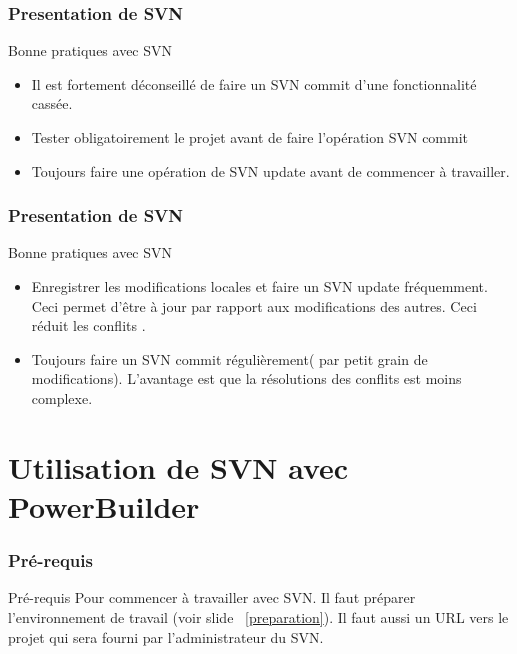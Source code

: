 \documentclass{beamer}
\begin{document}
\begin{frame}
\frametitle{Presentation de SVN}
\begin{block}{Bonne pratiques avec SVN}
\begin{itemize}
\item  Il est fortement déconseillé de faire un \alert{SVN commit  d’une fonctionnalité cassée}.
\item \alert{Tester obligatoirement le projet} avant de faire l’opération SVN commit
\item Toujours faire une opération de  \alert{SVN update} avant de commencer à travailler. 
 
\end{itemize}
\end{block}
\end{frame}

\begin{frame}
\frametitle{Presentation de SVN}
\begin{block}{Bonne pratiques avec SVN}
\begin{itemize}
\item Enregistrer  les modifications locales et faire un \alert{SVN update} fréquemment. Ceci permet d'être à jour par rapport aux modifications des autres. Ceci réduit les conflits .
\item Toujours faire  un \alert{SVN commit} régulièrement( par petit grain de modifications). L'avantage est que la résolutions des conflits est moins complexe. 
\end{itemize}
\end{block}
\end{frame}


\section{Utilisation de SVN avec PowerBuilder}

\begin{frame}
\frametitle{Pré-requis}
\begin{block}{Pré-requis}
Pour commencer à travailler avec SVN. Il faut préparer l'environnement de travail (voir slide ~\ref{preparation}). Il faut aussi un \alert{URL} vers le projet qui sera fourni par l'administrateur du SVN.
\end{block}
\end{frame}
\end{document}
